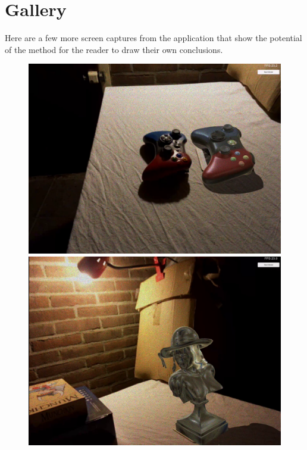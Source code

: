\section{Gallery}
Here are a few more screen captures from the application that show the potential of the method for the reader to draw their own conclusions.
\begin{figure}[H]
    \centering
    \begin{minipage}{0.38\textwidth}
        \centering
        \includegraphics[width=1.5\textwidth]{Figures/ContBoth.png} %
    \end{minipage}\hfill
    \begin{minipage}{0.38\textwidth}
        \centering
        \includegraphics[width=1.5\textwidth]{Figures/Lena1.png} %

\end{minipage}
\end{figure}
